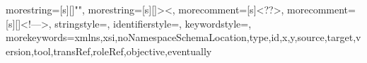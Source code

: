 {
  morestring=[s][\color{mauve}]{"}{"},
  morestring=[s][\color{black}]{>}{<},
  morecomment=[s]{<?}{?>},
  morecomment=[s][\color{dkgreen}]{<!--}{-->},
  stringstyle=\color{black},
  identifierstyle=\color{lightblue},
  keywordstyle=\color{red},
  morekeywords={xmlns,xsi,noNamespaceSchemaLocation,type,id,x,y,source,target,version,tool,transRef,roleRef,objective,eventually}%
}